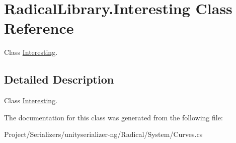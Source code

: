 \hypertarget{class_radical_library_1_1_interesting}{}\section{Radical\+Library.\+Interesting Class Reference}
\label{class_radical_library_1_1_interesting}


Class \hyperlink{class_radical_library_1_1_interesting}{Interesting}.  




\subsection{Detailed Description}
Class \hyperlink{class_radical_library_1_1_interesting}{Interesting}. 



The documentation for this class was generated from the following file\+:\begin{DoxyCompactItemize}
\item 
Project/\+Serializers/unityserializer-\/ng/\+Radical/\+System/Curves.\+cs\end{DoxyCompactItemize}
